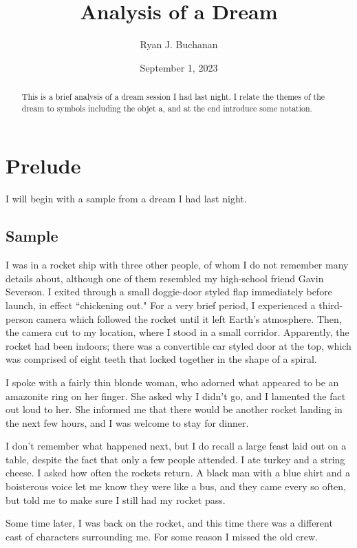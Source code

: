 \documentclass{article}
\title{Analysis of a Dream}
\author{Ryan J. Buchanan}
\date{September 1, 2023}
\begin{document}
	\maketitle
	
	\begin{abstract}
		This is a brief analysis of a dream session I had last night. I relate the themes of the dream to symbols including the objet a, and at the end introduce some notation.
	\end{abstract}
	
	\section{Prelude}
	I will begin with a sample from a dream I had last night.
	\subsection{Sample}
		I was in a rocket ship with three other people, of whom I do not remember many details about, although one of them resembled my high-school friend Gavin Severson. I exited through a small doggie-door styled flap immediately before launch, in effect ``chickening out." For a very brief period, I experienced a third-person camera which followed the rocket until it left Earth's atmosphere. Then, the camera cut to my location, where I stood in a small corridor. Apparently, the rocket had been indoors; there was a convertible car styled door at the top, which was comprised of eight teeth that locked together in the shape of a spiral.

		I spoke with a fairly thin blonde woman, who adorned what appeared to be an amazonite ring on her finger. She asked why I didn't go, and I lamented the fact out loud to her. She informed me that there would be another rocket landing in the next few hours, and I was welcome to stay for dinner.
		
		I don't remember what happened next, but I do recall a large feast laid out on a table, despite the fact that only a few people attended. I ate turkey and a string cheese. I asked how often the rockets return. A black man with a blue shirt and a boisterous voice let me know they were like a bus, and they came every so often, but told me to make sure I still had my rocket pass. 
		
		Some time later, I was back on the rocket, and this time there was a different cast of characters surrounding me. For some reason I missed the old crew. 
		
\end{document}
